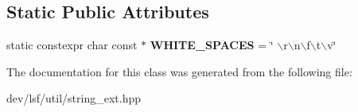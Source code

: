 \subsection*{Static Public Attributes}
\begin{DoxyCompactItemize}
\item 
\hypertarget{classlsf_1_1util_1_1StringExt_af0b20fb110a2457ff4adff7fddb67f46}{
static constexpr char const $\ast$ {\bfseries WHITE\_\-SPACES} = \char`\"{} $\backslash$r$\backslash$n$\backslash$f$\backslash$t$\backslash$v\char`\"{}}
\label{classlsf_1_1util_1_1StringExt_af0b20fb110a2457ff4adff7fddb67f46}

\end{DoxyCompactItemize}


The documentation for this class was generated from the following file:\begin{DoxyCompactItemize}
\item 
dev/lsf/util/string\_\-ext.hpp\end{DoxyCompactItemize}
